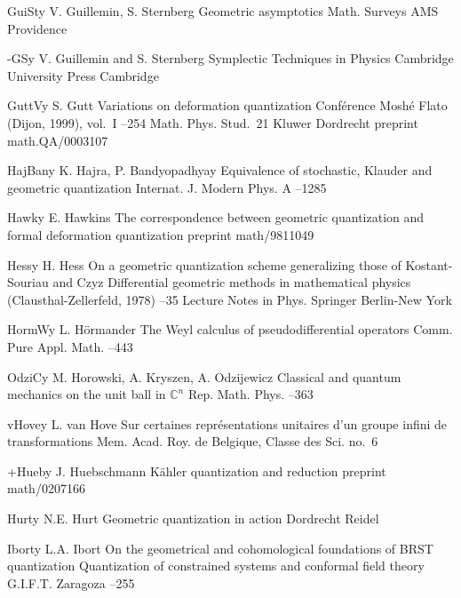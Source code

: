 \documentclass[11pt]{amsart}
\numberwithin{equation}{section}
\theoremstyle{remark}
\newcommand{\CC}{\C}
\newcommand{\by}{\mathbf y}
\newcommand{\C}{\mathbb C}
\begin{document}
\begin{thebibliography}{199}
 GuiSt\by{ V. Guillemin, S. Sternberg \book Geometric asymptotics
\bookinfo Math. Surveys  \publ AMS \publaddr Providence }

 -GS\by{ V. Guillemin and S. Sternberg \book Symplectic Techniques in
Physics \publ Cambridge University Press \publaddr Cambridge }

 GuttV\by{ S. Gutt \paper Variations on deformation quantization
\inbook Conf\'erence Mosh\'e Flato (Dijon, 1999), vol.~I --254
\bookinfo Math. Phys. Stud.~21 \publ Kluwer \publaddr Dordrecht 
\paperinfo preprint math.QA/0003107}

 HajBan\by{ K. Hajra, P. Bandyopadhyay \paper Equivalence of stochastic,
Klauder and geometric quantization \jour Internat. J. Modern Phys. A 
 --1285}

 Hawk\by{ E. Hawkins \paper The correspondence between geometric
quantization and formal deformation quantization \jour preprint math/9811049
}

 Hess\by{ H. Hess \paper On a geometric quantization scheme generalizing
those of Kostant-Souriau and Czyz \inbook Differential geometric methods
in mathematical physics (Clausthal-Zellerfeld, 1978) --35 \bookinfo
Lecture Notes in Phys.  \publ Springer \publaddr Berlin-New York
}

 HormW\by{ L. H\"ormander \paper The Weyl calculus of pseudodifferential
operators \jour Comm. Pure Appl. Math.   --443}

 OdziC\by{ M. Horowski, A. Kryszen, A. Odzijewicz \paper Classical and
quantum mechanics on the unit ball in $\CC^n$ \jour Rep. Math. Phys. 
 --363}

 vHove\by{ L. van Hove \paper Sur certaines repr\'esentations unitaires
d'un groupe infini de transformations \jour Mem. Acad. Roy. de Belgique, Classe
des Sci.   \pages no.~6}

 +Hueb\by{ J. Huebschmann \paper K\"ahler quantization and reduction
\paperinfo preprint math/0207166}

 Hurt\by{ N.E. Hurt \book Geometric quantization in action \publaddr
Dordrecht \publ Reidel }

 Ibort\by{ L.A. Ibort \paper On the geometrical and cohomological
foundations of BRST quantization \inbook Quantization of constrained systems
and conformal field theory  \publ G.I.F.T. \publaddr
Zaragoza  --255}


\end{thebibliography}
\end{document}
